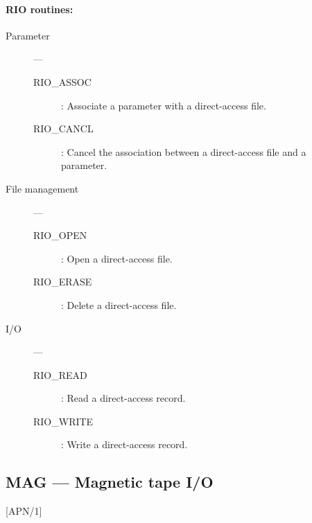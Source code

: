 \vspace*{10mm}

\paragraph{RIO routines:}

\begin{description}

\item [Parameter] ---

\begin{description}
\item [RIO\_ASSOC] : Associate a parameter with a direct-access file.
\item [RIO\_CANCL] : Cancel the association between a direct-access file and a
 parameter.
\end{description}

\item [File management] ---

\begin{description}
\item [RIO\_OPEN] : Open a direct-access file.
\item [RIO\_ERASE] : Delete a direct-access file.
\end{description}

\item [I/O] ---

\begin{description}
\item [RIO\_READ] : Read a direct-access record.
\item [RIO\_WRITE] : Write a direct-access record.
\end{description}

\end{description}

\newpage

\subsection{MAG --- Magnetic tape I/O}
\label{R_MAG}

\vspace{-9mm}

\hfill [APN/1]

\vspace{2mm}

